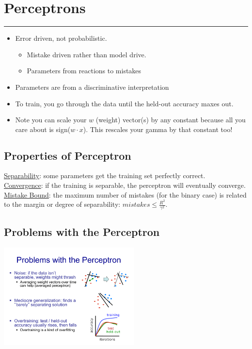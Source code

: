 \section{Perceptrons}
\smallskip \hrule height 2pt \smallskip

\begin{itemize}
	\item Error driven, not probabilistic. \hfill \\
		\begin{itemize}
			\item Mistake driven rather than model drive. \hfill \\
			\item Parameters from reactions to mistakes  %
		\end{itemize}
	\item Parameters are from a discriminative interpretation %
	\item To train, you go through the data until the held-out accuracy maxes out. %
	\item Note you can scale your $w$ (weight) vector(s) by any constant because all you care about is sign($w \cdot x$).
		This rescales your gamma by that constant too! \hfill \\
\end{itemize}

\subsection{Properties of Perceptron}
\underline{Separability}: some parameters get the training set perfectly correct. \hfill \\
\underline{Convergence}: if the training is separable, the perceptron will eventually converge. \hfill \\
\underline{Mistake Bound}: the maximum number of mistakes (for the binary case) is related to the 
margin or degree of separability: $mistakes \leq \frac{R^2}{\gamma^2}$. \hfill \\

\subsection{Problems with the Perceptron}
\includegraphics[width=2.8in]{figures/perceptron_problems.pdf}

